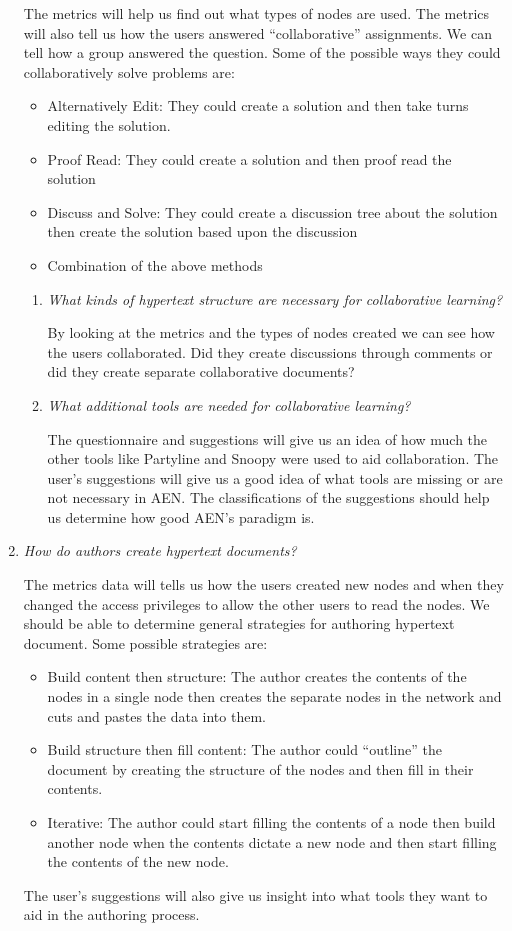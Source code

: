 \begin{enumerate}
  The metrics will help us find out what types of nodes are used.  The
  metrics will also tell us how the users answered ``collaborative''
  assignments.  We can tell how a group answered the question.
  Some of the possible ways they could collaboratively solve problems
  are:\begin{itemize}
\item{Alternatively Edit: They could create a solution and then take turns
  editing the solution.}
\item{Proof Read: They could create a solution and then proof read the
  solution}
\item{Discuss and Solve: They could create a discussion tree about the
  solution then create the solution based upon the discussion}
\item{Combination of the above methods}
\end{itemize}
\begin{enumerate}
\item{\em What kinds of hypertext structure are necessary for collaborative
  learning?}

  By looking at the metrics and the types of nodes created we can see how
  the users collaborated.  Did they create discussions through comments
  or did they create separate collaborative documents?

\item{\em What additional tools are needed for collaborative learning?}

  The questionnaire and suggestions will give us an idea of how much the
  other tools like Partyline and Snoopy were used to aid collaboration.
  The user's suggestions will give us a good idea of what tools are missing
  or are not necessary in AEN.  The classifications of the suggestions
  should help us determine how good AEN's paradigm is.
\end{enumerate} 
\item{\em How do authors create hypertext documents?}

  The metrics data will tells us how the users created new nodes and when
  they changed the access privileges to allow the other users to read the
  nodes.  We should be able to determine general strategies for authoring
  hypertext document.  Some possible strategies are:\begin{itemize}
\item{Build content then structure: The author creates the contents of the
  nodes in a single node then creates the separate nodes in the network and
  cuts and pastes the data into them.}
\item{Build structure then fill content: The author could ``outline'' the
  document by creating the structure of the nodes and then fill in their
  contents.}
\item{Iterative: The author could start filling the contents of a node
  then build another node when the contents dictate a new node and then
  start filling the contents of the new node.}\end{itemize}  The user's suggestions will also give us insight
  into what tools they want to aid in the authoring process.


\end{enumerate}
